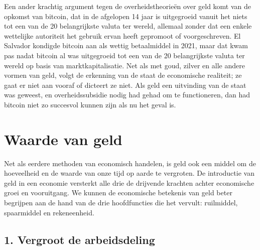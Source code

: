 Een ander krachtig argument tegen de overheidstheorieën over geld komt van de opkomst van bitcoin, dat in de afgelopen 14 jaar is uitgegroeid vanuit het niets tot een van de 20 belangrijkste valuta ter wereld, allemaal zonder dat een enkele wettelijke autoriteit het gebruik ervan heeft gepromoot of voorgeschreven. El Salvador kondigde bitcoin aan als wettig betaalmiddel in 2021, maar dat kwam pas nadat bitcoin al was uitgegroeid tot een van de 20 belangrijkste valuta ter wereld op basis van marktkapitalisatie. Net als met goud, zilver en alle andere vormen van geld, volgt de erkenning van de staat de economische realiteit; ze gaat er niet aan vooraf of dicteert ze niet. Als geld een uitvinding van de staat was geweest, en overheidssubsidie nodig had gehad om te functioneren, dan had bitcoin niet zo succesvol kunnen zijn als nu het geval is.

\hypertarget{waarde-van-geld}{%
\section{Waarde van geld}\label{waarde-van-geld}}

Net als eerdere methoden van economisch handelen, is geld ook een middel om de hoeveelheid en de waarde van onze tijd op aarde te vergroten. De introductie van geld in een economie versterkt alle drie de drijvende krachten achter economische groei en vooruitgang. We kunnen de economische betekenis van geld beter begrijpen aan de hand van de drie hoofdfuncties die het vervult: ruilmiddel, spaarmiddel en rekeneenheid.

\subsection{1. Vergroot de arbeidsdeling}

